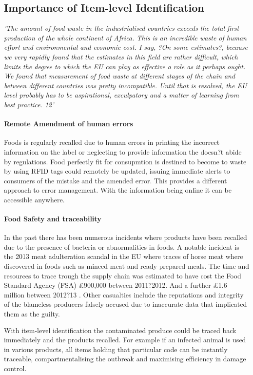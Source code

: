 \documentclass[a4paper, 11pt]{article}
\begin{document}
\subsection{Importance of Item-level Identification}
\emph{'The amount of food waste in the industrialised countries exceeds the total first
production of the whole continent of Africa. This is an incredible waste of human effort
and environmental and economic cost. I say, ?On some estimates?, because we very
rapidly found that the estimates in this field are rather difficult, which limits the degree
to which the EU can play as effective a role as it perhaps ought. We found that
measurement of food waste at different stages of the chain and between different
countries was pretty incompatible. Until that is resolved, the EU level probably has to
be aspirational, exculpatory and a matter of learning from best practice. 12'}

\paragraph{Remote Amendment of human errors}
Foods is regularly recalled due to human errors in printing the incorrect information on the label or neglecting to provide information the doesn?t abide by regulations. Food perfectly fit for consupmtion is destined to become to waste by using RFID tags could remotely be updated, issuing immediate alerts to consumers of the mistake and the amended error. This provides a different approach to error management. With the information being online it can be accessible anywhere.

\paragraph{Food Safety and traceability}
In the past there has been numerous incidents where products have been recalled due to the presence of bacteria or abnormalities in foods. A notable incident is the 2013 meat adulteration scandal in the EU where traces of horse meat where discovered in foods such as minced meat and ready prepared meals. The time and resources to trace trough the supply chain was estimated to have cost the Food Standard Agency (FSA) \pounds900,000 between 2011?2012. And a further \pounds1.6 million between 2012?13 \cite{3}. Other casualties include the reputations and integrity of the blameless producers falsely accused due to inaccurate data that implicated them as the guilty. 

With item-level identification the contaminated produce could be traced back immediately and the products recalled. For example if an infected animal is used in various products, all items holding that particular code can be instantly traceable, compartmentalising the outbreak and maximising efficiency in damage control. 
\end{document}
